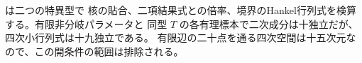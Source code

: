  は二つの特異型で
核の貼合、二項結果式との倍率、境界のHankel行列式を検算する。有限非分岐パラメータと
同型 $T$ の各有理標本で二次成分は十独立だが、四次小行列式は十九独立である。
有限辺の二十点を通る四次空間は十五次元なので、この開条件の範囲は排除される。
